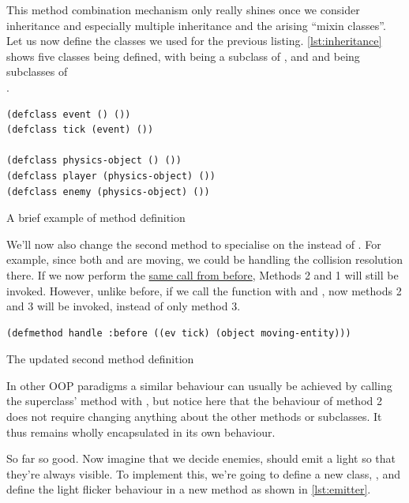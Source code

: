 \documentclass[a4paper]{paper}
\begin{document}
This method combination mechanism only really shines once we consider inheritance and especially multiple inheritance and the arising ``mixin classes''. Let us now define the classes we used for the previous listing. \autoref{lst:inheritance} shows five classes being defined, with  being a subclass of , and  and  being subclasses of \\.

\begin{listing}[H]
\begin{verbatim}
(defclass event () ())
(defclass tick (event) ())

(defclass physics-object () ())
(defclass player (physics-object) ())
(defclass enemy (physics-object) ())
\end{verbatim}
\caption{A brief example of method definition}
\label{lst:inheritance}
\end{listing}

We'll now also change the second method to specialise on the  instead of . For example, since both  and  are moving, we could be handling the collision resolution there. If we now perform the \hyperlink{first-call}{same call from before}, Methods 2 and 1 will still be invoked. However, unlike before, if we call the function with  and , now methods 2 and 3 will be invoked, instead of only method 3.

\begin{listing}[h]
\begin{verbatim}
(defmethod handle :before ((ev tick) (object moving-entity)))
\end{verbatim}
\caption{The updated second method definition}
\label{lst:updated method}
\end{listing}

In other OOP paradigms a similar behaviour can usually be achieved by calling the superclass' method with , but notice here that the behaviour of method 2 does not require changing anything about the other methods or subclasses. It thus remains wholly encapsulated in its own behaviour.

So far so good. Now imagine that we decide enemies, should emit a light so that they're always visible. To implement this, we're going to define a new class, , and define the light flicker behaviour in a new  method as shown in \autoref{lst:emitter}.
\end{document}
